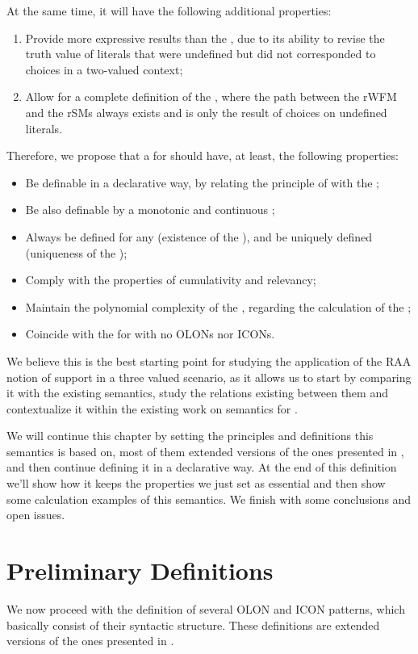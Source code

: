 At the same time, it will have the following additional properties:

\begin{enumerate}
	\item Provide more expressive results than the \wfs, due to its ability to revise the truth value of literals that were undefined but did not corresponded to choices in a two-valued context;
	\item Allow for a complete definition of the \rpsms, where the path between the rWFM and the rSMs always exists and is only the result of choices on undefined literals.
\end{enumerate}

Therefore, we propose that a \rwfs for \nlps should have, at least, the following properties:

\begin{itemize}
\item Be definable in a declarative way, by relating the principle of \raa with the \wfs;
\item Be also definable by a monotonic and continuous \fpo;
\item Always be defined for any \nlp (existence of the \rwfm), and be uniquely defined (uniqueness of the \rwfm);
\item Comply with the properties of cumulativity and relevancy;
\item Maintain the polynomial complexity of the \wfs, regarding the calculation of the \rwfm;
\item Coincide with the \wfs for \nlps with no OLONs nor ICONs.
\end{itemize}

We believe this is the best starting point for studying the application of the RAA notion of support in a three valued scenario, as it allows us to start by comparing it with the existing semantics, study the relations existing between them and contextualize it within the existing work on semantics
for \nlps.

We will continue this chapter by setting the principles and definitions this semantics is based on, most of them extended versions of the ones presented in \cite{ampMSc}, and then continue defining it in a declarative way. At the end of this definition we'll show how it keeps the properties we just set as essential and then show some calculation examples of this semantics. We finish with some conclusions and open issues.


\section{Preliminary Definitions}
\label{subsec:preliminary}
We now proceed with the definition of several OLON and ICON patterns, which basically consist of their syntactic structure. These definitions are extended versions of the ones presented in \cite{ampMSc}.


